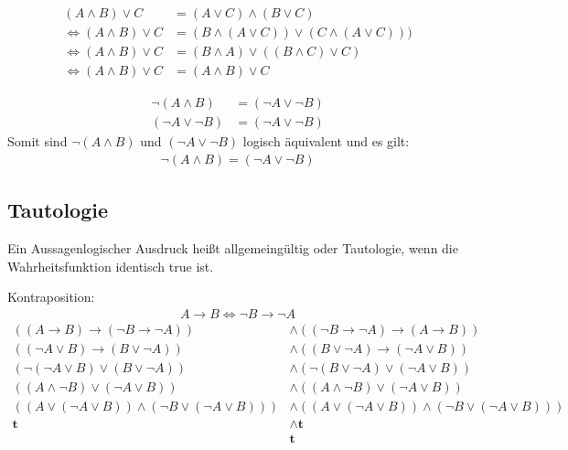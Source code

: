 \documentclass[12pt,a4paper,titlepage,draft]{article}
\begin{document}
	\begin{bsp}
		\begin{align*}
			(A \wedge B) \vee C &= (A \vee C) \wedge (B \vee C)\\
			\Leftrightarrow (A \wedge B) \vee C &= (B \wedge (A \vee C)) \vee (C \wedge (A \vee C)))\\
			\Leftrightarrow (A \wedge B) \vee C &=  (B \wedge A) \vee ((B \wedge C) \vee C)\\
	 		\Leftrightarrow (A \wedge B) \vee C &= (A \wedge B) \vee C
		\end{align*}		
	\end{bsp}
	\begin{bsp}
		\begin{align*}
			\neg(A \wedge B) &= (\neg A \vee \neg B)\\
			(\neg A \vee \neg B) &= (\neg A \vee \neg B)
		\end{align*}
		Somit sind \(\neg(A \wedge B)\) und \((\neg A \vee \neg B)\) logisch äquivalent und es gilt:
		\begin{align*}
			\neg(A \wedge B) = (\neg A \vee \neg B)
		\end{align*}
	\end{bsp}
	\subsection{Tautologie}
	\begin{defi}
		Ein Aussagenlogischer Ausdruck heißt allgemeingültig oder Tautologie, wenn die Wahrheitsfunktion identisch true ist.
	\end{defi}	
	\begin{bsp}
		Kontraposition:\\
		\begin{align*}
			A \rightarrow B \Leftrightarrow \neg B \rightarrow \neg A
		\end{align*}
		\begin{align*}
			((A \rightarrow B) \rightarrow (\neg B \rightarrow \neg A)) &\wedge ((\neg B \rightarrow \neg A) \rightarrow (A \rightarrow B))\\
			((\neg A \vee B) \rightarrow (B \vee \neg A)) &\wedge ((B \vee \neg A) \rightarrow (\neg A \vee B))\\
			(\neg (\neg A \vee B) \vee (B \vee \neg A)) &\wedge (\neg (B \vee \neg A) \vee (\neg A \vee B))\\
			((A \wedge \neg B) \vee (\neg A \vee B)) &\wedge ((A \wedge \neg B) \vee (\neg A \vee B))\\
			((A \vee (\neg A \vee B)) \wedge (\neg B \vee (\neg A \vee B))) &\wedge ((A \vee (\neg A \vee B)) \wedge (\neg B \vee (\neg A \vee B)))\\
			\textbf{t} &\wedge \textbf{t}\\
			&\textbf{t}
		\end{align*}
	\end{bsp}
\end{document}
